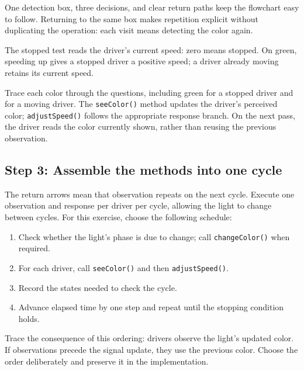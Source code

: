 \documentclass[11pt,a4paper]{article}
\begin{document}
One detection box, three decisions, and clear return paths keep the flowchart easy to follow. Returning to the same box makes repetition explicit without duplicating the operation: each visit means detecting the color again.

The stopped test reads the driver's current speed: zero means stopped. On green, speeding up gives a stopped driver a positive speed; a driver already moving retains its current speed.

Trace each color through the questions, including green for a stopped driver and for a moving driver. The \texttt{seeColor()} method updates the driver's perceived color; \texttt{adjustSpeed()} follows the appropriate response branch. On the next pass, the driver reads the color currently shown, rather than reusing the previous observation.

\subsection{Step 3: Assemble the methods into one cycle}

The return arrows mean that observation repeats on the next cycle. Execute one observation and response per driver per cycle, allowing the light to change between cycles. For this exercise, choose the following schedule:

\begin{enumerate}
\item Check whether the light's phase is due to change; call \texttt{changeColor()} when required.
\item For each driver, call \texttt{seeColor()} and then \texttt{adjustSpeed()}.
\item Record the states needed to check the cycle.
\item Advance elapsed time by one step and repeat until the stopping condition holds.
\end{enumerate}

Trace the consequence of this ordering: drivers observe the light's updated color. If observations precede the signal update, they use the previous color. Choose the order deliberately and preserve it in the implementation.
\end{document}
